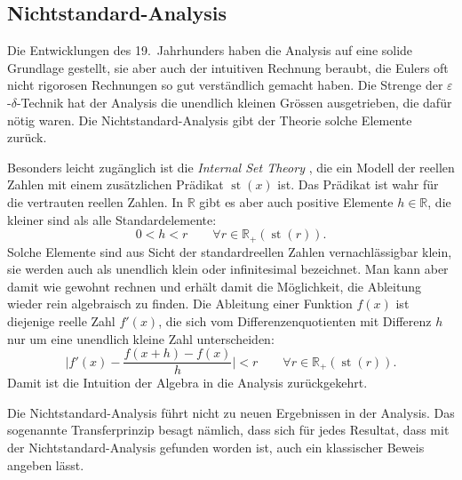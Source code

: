 %
%
\subsection{Nichtstandard-Analysis}
Die Entwicklungen des 19.~Jahrhunders haben die Analysis auf eine
solide Grundlage gestellt, sie aber auch der intuitiven Rechnung
beraubt, die Eulers oft nicht rigorosen Rechnungen so gut
verständlich gemacht haben.
Die Strenge der $\varepsilon$-$\delta$-Technik hat der Analysis die
unendlich kleinen Grössen ausgetrieben, die dafür nötig waren.
Die Nichtstandard-Analysis gibt der Theorie solche Elemente
%
zurück.

Besonders leicht zugänglich ist die \emph{Internal Set Theory} \cite{buch:ist},
%
die ein Modell der reellen Zahlen mit einem zusätzlichen Prädikat
$\operatorname{st}(x)$ ist.
Das Prädikat ist wahr für die vertrauten reellen Zahlen.
In $\mathbb{R}$ gibt es aber auch positive Elemente $h\in\mathbb{R}$, 
die kleiner sind als alle Standardelemente:
\[
0<h<r\qquad\forall r\in\mathbb{R}_+(\operatorname{st}(r)).
\]
Solche Elemente sind aus Sicht der standardreellen Zahlen vernachlässigbar
klein, sie werden auch als unendlich klein oder infinitesimal bezeichnet.
Man kann aber damit wie gewohnt rechnen und erhält damit die Möglichkeit,
die Ableitung wieder rein algebraisch zu finden.
Die Ableitung einer Funktion $f(x)$ ist diejenige reelle Zahl $f'(x)$,
die sich vom Differenzenquotienten mit Differenz $h$ nur um eine 
%
unendlich kleine Zahl unterscheiden:
\[
\biggl|
f'(x)
-
\frac{f(x+h)-f(x)}{h}
\biggr|
<
r
\qquad\forall r\in\mathbb{R}_+(\operatorname{st}(r)).
\]
Damit ist die Intuition der Algebra in die Analysis zurückgekehrt.

Die Nichtstandard-Analysis führt nicht zu neuen Ergebnissen in der
Analysis.
Das sogenannte Transferprinzip besagt nämlich, dass sich für jedes Resultat,
%
dass mit der Nichtstandard-Analysis gefunden worden ist, auch ein
klassischer Beweis angeben lässt.

